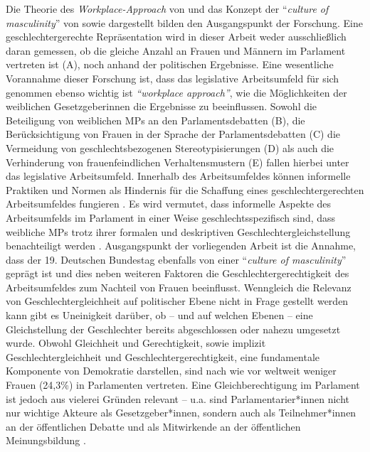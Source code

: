 \documentclass[12pt, 
    twoside=false, 
    bibliography=totoc, 
    numbers=endperiod, 
    headings=normal, 
    toc=chapterentrydotfill
    ]{scrbook}
\begin{document}
Die Theorie des \emph{Workplace-Approach} von \textcite{erikson_2018} und das Konzept der \enquote{\emph{culture of masculinity}} von \textcite{lovenduski_2005} sowie \textcite{erikson_2018} dargestellt bilden den Ausgangspunkt der Forschung. Eine geschlechtergerechte Repräsentation wird in dieser Arbeit weder ausschließlich daran gemessen, ob die gleiche Anzahl an Frauen und Männern im Parlament vertreten ist (A), noch anhand der politischen Ergebnisse. Eine wesentliche Vorannahme dieser Forschung ist, dass das legislative Arbeitsumfeld für sich genommen ebenso wichtig ist \emph{\enquote{workplace approach}}, wie die Möglichkeiten der weiblichen Gesetzgeberinnen die Ergebnisse zu beeinflussen. Sowohl die Beteiligung von weiblichen MPs an den Parlamentsdebatten (B), die Berücksichtigung von Frauen in der Sprache der Parlamentsdebatten (C) die Vermeidung von geschlechtsbezogenen Stereotypisierungen (D) als auch die Verhinderung von frauenfeindlichen Verhaltensmustern (E) fallen hierbei unter das legislative Arbeitsumfeld. 
Innerhalb des Arbeitsumfeldes können informelle Praktiken und Normen als Hindernis für die Schaffung eines geschlechtergerechten Arbeitsumfeldes fungieren \parencite[200]{erikson_2018}. Es wird vermutet, dass informelle Aspekte des Arbeitsumfelds im Parlament in einer Weise geschlechtsspezifisch sind, dass weibliche MPs trotz ihrer formalen und deskriptiven Geschlechtergleichstellung benachteiligt werden \parencite[210]{erikson_2018}. Ausgangspunkt der vorliegenden Arbeit ist die Annahme, dass der 19. Deutschen Bundestag ebenfalls von einer \enquote{\emph{culture of masculinity}} geprägt ist und dies neben weiteren Faktoren die Geschlechtergerechtigkeit des Arbeitsumfeldes zum Nachteil von Frauen beeinflusst.
Wenngleich die Relevanz von Geschlechtergleichheit auf politischer Ebene nicht in Frage gestellt werden kann gibt es Uneinigkeit darüber, ob -- und auf welchen Ebenen -- eine  Gleichstellung der Geschlechter bereits abgeschlossen oder nahezu umgesetzt wurde.
Obwohl Gleichheit und Gerechtigkeit, sowie implizit Geschlechtergleichheit und Geschlechtergerechtigkeit, eine fundamentale Komponente von Demokratie darstellen, sind nach wie vor weltweit weniger Frauen (24,3\%) \parencite[]{ipu_2019} in Parlamenten vertreten. Eine Gleichberechtigung im Parlament ist jedoch aus vielerei Gründen relevant -- u.a. sind Parlamentarier*innen nicht nur wichtige Akteure als Gesetzgeber*innen, sondern auch als Teilnehmer*innen an der öffentlichen Debatte und als Mitwirkende an der öffentlichen Meinungsbildung \parencite[188]{dahlerup_2018}.
\end{document}

